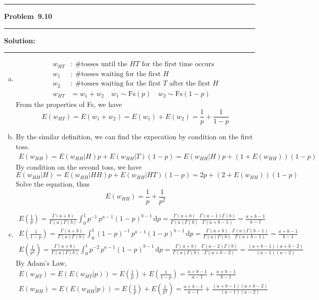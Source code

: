 \documentclass[10.5pt]{article}
\newcommand\question[1]{\vspace{.2in}\hrule\vspace{0.04in}\textbf{Problem\ #1}\vspace{.4em}\hrule\vspace{.10in}}
\newcommand\Solution{\vspace{.3in}\textbf{Solution:}\vspace{.5em}\hrule\vspace{.08in}\par}
\begin{document}
\pagebreak
\question{9.10}
\Solution{}
\begin{enumerate}[(a)]
	\item \begin{align*}
		w_{HT} &:\ \text{\# tosses until the $HT$ for the first time occurs}\\[6pt]
		w_{1} &:\ \text{\# tosses waiting for the first $H$}\\[6pt]
		w_{2} &:\ \text{\# tosses waiting for the first $T$ after the first $H$}\\[6pt]
		w_{HT} &= w_1 + w_2\quad w_1\sim\text{Fs}(p)\quad w_2\sim\text{Fs}(1-p)
	\end{align*}
	From the properties of Fs, we have $$E(w_{HT}) = E(w_1+w_2) = E(w_1)+E(w_2) = \frac{1}{p}+\frac{1}{1-p}$$
	\vspace{0.5cm}
	\item By the similar definition, we can find the expecation by condition on the first toss.
	\begin{align*}
		E(w_{HH}) = E(w_{HH}|H)p + E(w_{HH}|T)(1-p) = E(w_{HH}|H)p + (1+E(w_{HH}))(1-p)
	\end{align*}
	By condition on the second toss,  we have
	$$E(w_{HH}|H) = E(w_{HH}|HH)p+E(w_{HH}|HT)(1-p) = 2p + (2+E(w_{HH}))(1-p)$$
	Solve the equation, thus$$E(w_{HH}) = \frac{1}{p}+\frac{1}{p^2}$$\vspace{0.5cm}
	\item 
	\begin{gather*}
		E\left(\frac{1}{p}\right) = \frac{\Gamma(a+b)}{\Gamma(a)\Gamma(b)}\int_0^1{p}^{-1}\, p^{a-1}(1-p)^{b-1}\,\mathrm{d} p = \frac{\Gamma(a+b)}{\Gamma(a)\Gamma(b)}\frac{\Gamma(a-1)\Gamma(b)}{\Gamma(a+b-1)} = \frac{a+b-1}{a-1}\\[8pt]
		E\left(\frac{1}{1-p}\right) = \frac{\Gamma(a+b)}{\Gamma(a)\Gamma(b)}\int_0^1{(1-p)}^{-1}\, p^{a-1}(1-p)^{b-1}\,\mathrm{d} p = \frac{\Gamma(a+b)}{\Gamma(a)\Gamma(b)}\frac{\Gamma(a)\Gamma(b-1)}{\Gamma(a+b-1)} = \frac{a+b-1}{b-1}\\[8pt]
		E\left(\frac{1}{p^2}\right) = \frac{\Gamma(a+b)}{\Gamma(a)\Gamma(b)}\int_0^1{p}^{-2}\, p^{a-1}(1-p)^{b-1}\,\mathrm{d} p = \frac{\Gamma(a+b)}{\Gamma(a)\Gamma(b)}\frac{\Gamma(a-2)\Gamma(b)}{\Gamma(a+b-2)} = \frac{(a+b-1)(a+b-2)}{(a-1)(a-2)}
	\end{gather*}
	By Adam's Law,
	\begin{gather*}
		E(w_{HT}) = E(E(w_{HT}|p)) = E\left(\frac{1}{p}\right)+E\left(\frac{1}{1-p}\right) = \frac{a+b-1}{a-1}+\frac{a+b-1}{b-1}\\[8pt]
		E(w_{HH}) = E(E(w_{HH}|p)) = E\left(\frac{1}{p}\right)+E\left(\frac{1}{p^2}\right) = \frac{a+b-1}{a-1}+\frac{(a+b-1)(a+b-2)}{(a-1)(a-2)}
	\end{gather*}
\end{enumerate}
\end{document}
